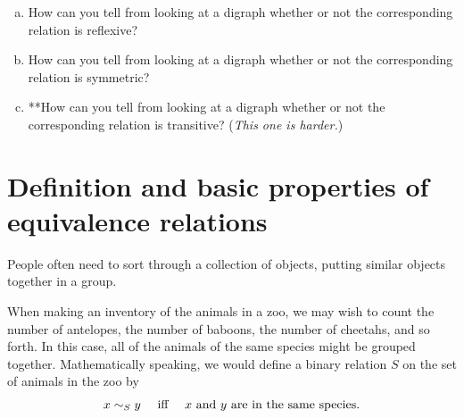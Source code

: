 \begin{exercise}\label{exercise:EquivalenceRelationsChap:21}
\begin{enumerate}[(a)]
\item
How can you tell from looking at a digraph whether or not the corresponding relation is reflexive?
\item
How can you tell from looking at a digraph whether or not the corresponding relation is symmetric? 
\item
**How can you tell from looking at a digraph whether or not the corresponding relation is transitive? (\emph{This one is harder.})
\end{enumerate}
\end{exercise}





\section{Definition and basic properties of equivalence relations} \label{EquivalenceRelationsDefnSect}

People often need to sort through a collection of objects, putting similar objects together in a group. 

\begin{eg} \label{EquivRelZooEg}
When making an inventory of the animals in a zoo, we may wish to count the number of antelopes, the number of baboons, the number of cheetahs, and so forth. In this case, all of the animals of the same species might be grouped together. Mathematically speaking, we would define a binary relation $S$ on the set of animals in the zoo by 
	$$ \text{$x \sim_S y$ \quad iff \quad $x$ and $y$ are in the same species} .$$
\end{eg}


